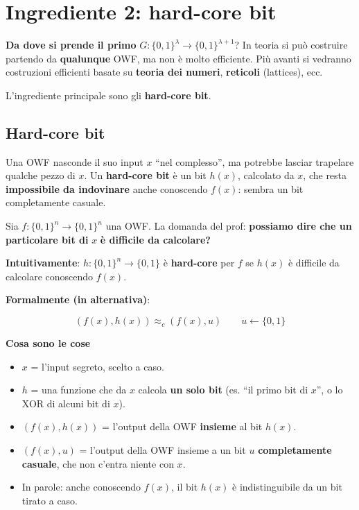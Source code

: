\section{Ingrediente 2: hard-core bit}

\textbf{Da dove si prende il primo} \(G : \{0,1\}^\lambda \to \{0,1\}^{\lambda+1}\)? In teoria si può costruire partendo da \textbf{qualunque} OWF, ma non è molto efficiente. Più avanti si vedranno costruzioni efficienti basate su \textbf{teoria dei numeri}, \textbf{reticoli} (lattices), ecc.

L'ingrediente principale sono gli \textbf{hard-core bit}.

\subsection{Hard-core bit}

\begin{inbreve}

Una OWF nasconde il suo input \(x\) ``nel complesso'', ma potrebbe lasciar trapelare qualche pezzo di \(x\). Un \textbf{hard-core bit} è un bit \(h(x)\), calcolato da \(x\), che resta \textbf{impossibile da indovinare} anche conoscendo \(f(x)\): sembra un bit completamente casuale.

\end{inbreve}

Sia \(f : \{0,1\}^n \to \{0,1\}^n\) una OWF. La domanda del prof: \textbf{possiamo dire che un particolare bit di} \(x\) \textbf{è difficile da calcolare?}

\textbf{Intuitivamente}: \(h : \{0,1\}^n \to \{0,1\}\) è \textbf{hard-core} per \(f\) se \(h(x)\) è difficile da calcolare conoscendo \(f(x)\).

\textbf{Formalmente (in alternativa)}:

\[
(f(x), h(x)) \approx_c (f(x), u) \qquad u \leftarrow \{0,1\}
\]

\begin{nota}

\textbf{Cosa sono le cose}

\begin{itemize}
\tightlist
\item
  \(x\) = l'input segreto, scelto a caso.
\item
  \(h\) = una funzione che da \(x\) calcola \textbf{un solo bit} (es. ``il primo bit di \(x\)'', o lo XOR di alcuni bit di \(x\)).
\item
  \((f(x), h(x))\) = l'output della OWF \textbf{insieme} al bit \(h(x)\).
\item
  \((f(x), u)\) = l'output della OWF insieme a un bit \(u\) \textbf{completamente casuale}, che non c'entra niente con \(x\).
\item
  In parole: anche conoscendo \(f(x)\), il bit \(h(x)\) è indistinguibile da un bit tirato a caso.
\end{itemize}

\end{nota}

